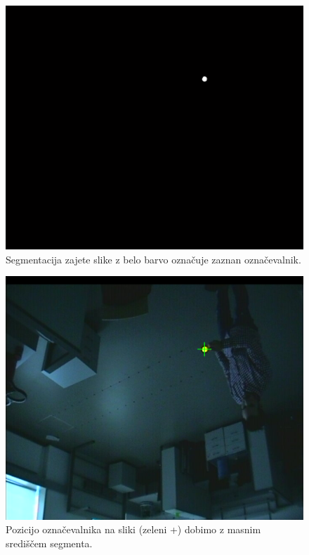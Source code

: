 \documentclass[a4paper, 12pt]{book}
\begin{document}
\begin{figure}[H]
\centering
\includegraphics[width=\textwidth,height=\textheight,keepaspectratio]{segmented.png}
\caption{Segmentacija zajete slike z belo barvo označuje zaznan označevalnik.}
\end{figure}

\begin{figure}[H]
\centering
\includegraphics[width=\textwidth,height=\textheight,keepaspectratio]{detected.png}
\caption{Pozicijo označevalnika na sliki (zeleni +) dobimo z masnim središčem segmenta.}
\end{figure}
\end{document}
